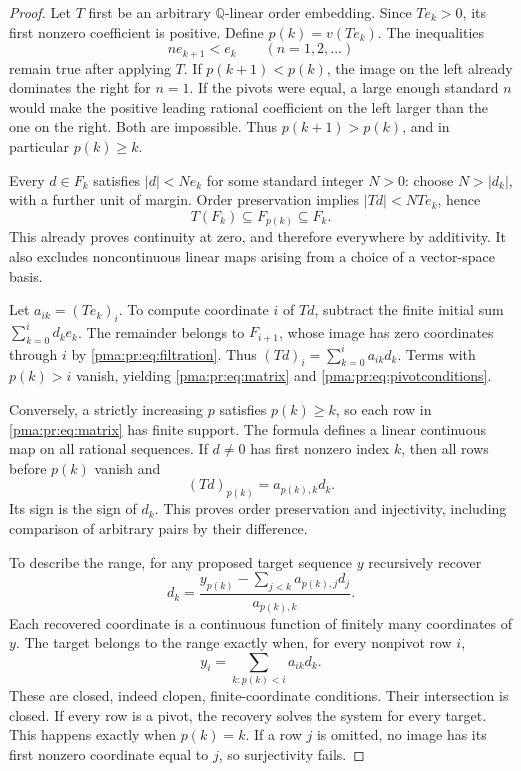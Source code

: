 \documentclass[11pt]{article}
\numberwithin{equation}{section}
\theoremstyle{definition}
\theoremstyle{remark}
\newcommand{\Q}{\mathbb Q}
\begin{document}
\begin{proof}
Let $T$ first be an arbitrary $\Q$-linear order embedding. Since $Te_k>0$,
its first nonzero coefficient is positive. Define $p(k)=v(Te_k)$. The
inequalities
\[
 ne_{k+1}<e_k\qquad(n=1,2,\ldots)
\]
remain true after applying $T$. If $p(k+1)<p(k)$, the image on the left
already dominates the right for $n=1$. If the pivots were equal, a large
enough standard $n$ would make the positive leading rational coefficient
on the left larger than the one on the right. Both are impossible.
Thus $p(k+1)>p(k)$, and in particular $p(k)\geq k$.

Every $d\in F_k$ satisfies $|d|<Ne_k$ for some standard integer $N>0$:
choose $N>|d_k|$, with a further unit of margin. Order preservation implies
$|Td|<NTe_k$, hence
\begin{equation}\label{pma:pr:eq:filtration}
 T(F_k)\subseteq F_{p(k)}\subseteq F_k.
\end{equation}
This already proves continuity at zero, and therefore everywhere by
additivity. It also excludes noncontinuous linear maps arising from a
choice of a vector-space basis.

Let $a_{ik}=(Te_k)_i$. To compute coordinate $i$ of $Td$, subtract the
finite initial sum $\sum_{k=0}^{i}d_ke_k$. The remainder belongs to
$F_{i+1}$, whose image has zero coordinates through $i$ by
\eqref{pma:pr:eq:filtration}. Thus
$(Td)_i=\sum_{k=0}^{i}a_{ik}d_k$. Terms with $p(k)>i$ vanish, yielding
\eqref{pma:pr:eq:matrix} and \eqref{pma:pr:eq:pivotconditions}.

Conversely, a strictly increasing $p$ satisfies $p(k)\geq k$, so each row
in \eqref{pma:pr:eq:matrix} has finite support. The formula defines a linear
continuous map on all rational sequences. If $d\ne0$ has first nonzero
index $k$, then all rows before $p(k)$ vanish and
\[
 (Td)_{p(k)}=a_{p(k),k}d_k.
\]
Its sign is the sign of $d_k$. This proves order preservation and
injectivity, including comparison of arbitrary pairs by their difference.

To describe the range, for any proposed target sequence $y$ recursively
recover
\begin{equation}\label{pma:pr:eq:pivotrecovery}
 d_k=\frac{y_{p(k)}-\sum_{j<k}a_{p(k),j}d_j}{a_{p(k),k}}.
\end{equation}
Each recovered coordinate is a continuous function of finitely many
coordinates of $y$. The target belongs to the range exactly when, for
every nonpivot row $i$,
\begin{equation}\label{pma:pr:eq:nonpivotconstraints}
 y_i=\sum_{k:p(k)<i}a_{ik}d_k.
\end{equation}
These are closed, indeed clopen, finite-coordinate conditions. Their
intersection is closed. If every row is a pivot, the recovery solves the
system for every target. This happens exactly when $p(k)=k$. If a row
$j$ is omitted, no image has its first nonzero coordinate equal to $j$,
so surjectivity fails.
\end{proof}
\end{document}
